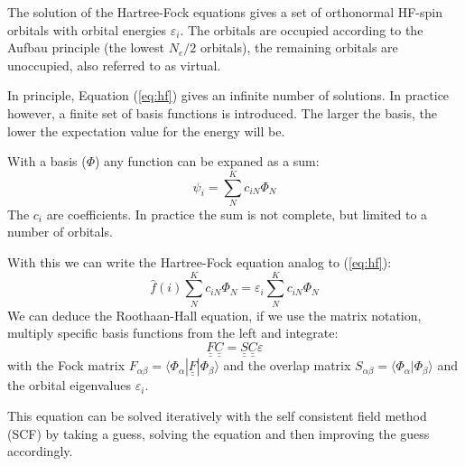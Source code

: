 \documentclass[11pt,DIV=13,BCOR=5mm,a4paper,headinclude]{scrbook}
\renewcommand{\vec}[1]{\underline{#1}}
\def\doubleunderline#1{\underline{\underline{#1}}}
\begin{document}
The solution of the Hartree-Fock equations gives a set of orthonormal HF-spin orbitals with orbital energies $\varepsilon_i$.
The orbitals are occupied according to the Aufbau principle (the lowest $N_e/2$ orbitals), the remaining orbitals are unoccupied, also referred to as virtual. 

In principle, Equation (\ref{eq:hf}) gives an infinite number of solutions.
In practice however, a finite set of basis functions is introduced.
The larger the basis, the lower the expectation value for the energy will be.

With a basis ($\Phi$) any function can be expaned as a sum:
\begin{equation}\label{eq:basis}
\psi_i=\sum_N^Kc_{iN}\Phi_N
\end{equation}
The $c_i$ are coefficients.
In practice the sum is not complete, but limited to a number of orbitals.

With this we can write the Hartree-Fock equation analog to (\ref{eq:hf}):
\begin{equation}
 \hat{f}(i) \sum_N^Kc_{iN}\Phi_N = \varepsilon_i \sum_N^Kc_{iN}\Phi_N
\end{equation}
We can deduce the Roothaan-Hall equation, if we use the matrix notation, multiply specific basis functions from the left and integrate:
\begin{equation}\label{eq:RH}
 \doubleunderline{F}\doubleunderline{C}=\doubleunderline{S}\doubleunderline{C}\varepsilon
\end{equation}
with the Fock matrix $F_{\alpha\beta}=\langle \Phi_\alpha|\doubleunderline{F}|\Phi_\beta\rangle$ and the overlap matrix $S_{\alpha\beta}=\langle \Phi_\alpha|\Phi_\beta\rangle$ and the orbital eigenvalues $\varepsilon_i$.

This equation can be solved iteratively with the self consistent field method (SCF) by taking a guess, solving the equation and then improving the guess accordingly.
\end{document}
